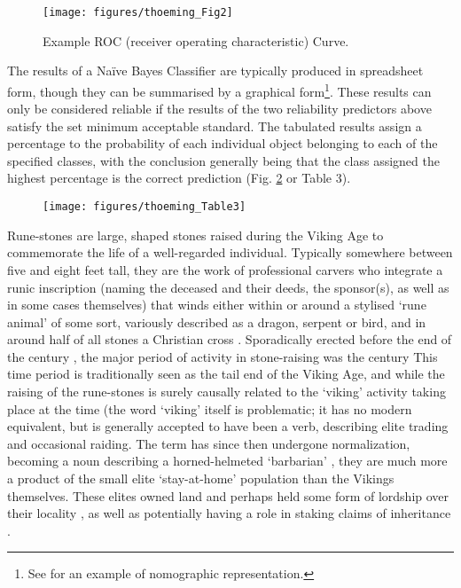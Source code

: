 	\begin{figure}[!htb]
		\texttt{[image: figures/thoeming\_Fig2]}
		\centering
		\caption{Example ROC (receiver operating characteristic) Curve.}
		\label{fig:Fig2}
	\end{figure}
	The results of a Naïve Bayes Classifier are typically produced in spreadsheet form, though they can be summarised by a graphical form\footnote{See \textcite[490]{Gansell_2006} for an example of nomographic representation.}. These results can only be considered reliable if the results of the two reliability predictors above satisfy the set minimum acceptable standard. The tabulated results assign a percentage to the probability of each individual object belonging to each of the specified classes, with the conclusion generally being that the class assigned the highest percentage is the correct prediction (Fig. \ref{fig:Table3} or Table 3).
	
	\begin{figure}[!htb]
		\texttt{[image: figures/thoeming\_Table3]}
		\centering
		\label{fig:Table3}
	\end{figure}
Rune-stones are large, shaped stones raised during the Viking Age to commemorate the life of a well-regarded individual. Typically somewhere between five and eight feet tall, they are the work of professional carvers who integrate a runic inscription (naming the deceased and their deeds, the sponsor(s), as well as in some cases themselves) that winds either within or around a stylised ‘rune animal’ of some sort, variously described as a dragon, serpent or bird, and in around half of all stones a Christian cross \parencite[10]{Sawyer_2000}. Sporadically erected before the end of the  century \AD, the major period of activity in stone-raising was the  century \AD This time period is traditionally seen as the tail end of the Viking Age, and while the raising of the rune-stones is surely causally related to the ‘viking’ activity taking place at the time (the word ‘viking’ itself is problematic; it has no modern equivalent, but is generally accepted to have been a verb, describing elite trading and occasional raiding. The term has since then undergone normalization, becoming a noun describing a horned-helmeted ‘barbarian’ \parencite[56]{Jesch_2001}, they are much more a product of the small elite ‘stay-at-home’ population than the Vikings themselves. These elites owned land and perhaps held some form of lordship over their locality \parencite[36--41]{Jesch_2001}, as well as potentially having a role in staking claims of inheritance \parencite[74--91]{Sawyer_2000}.

